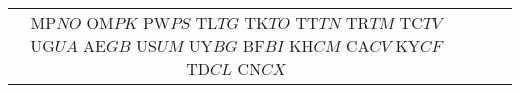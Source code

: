 \begin{tabular}{ c | c | c | c | }
MP$ %
NO$ %
OM$ %
PK$ %
PW$ %
PS$ %
TL$ %
TG$ %
TK$ %
TO$ %
TT$ %
TN$ %
TR$ %
TM$ %
TC$ %
TV$ %
UG$ %
UA$ %
AE$ %
GB$ %
US$ %
UM$ %
UY$ %
BG$ %
BF$ %
BI$ %
KH$ %
CM$ %
CA$ %
CV$ %
KY$ %
CF$ %
TD$ %
CL$ %
CN$ %
CX$ %

\end{tabular}
